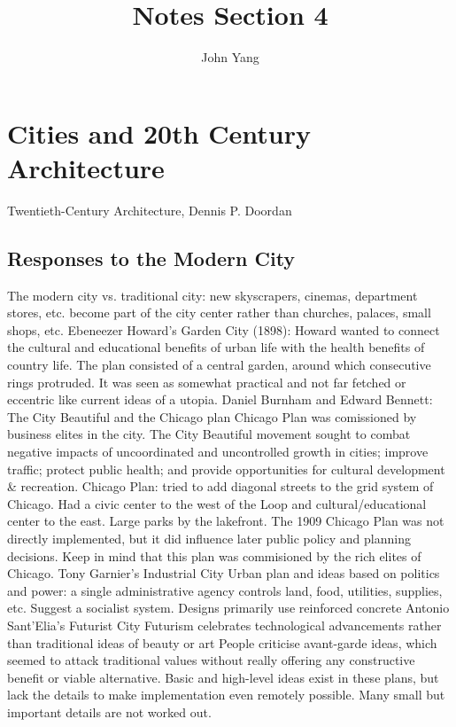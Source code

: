 \documentclass{article}
\title{Notes Section 4} %
\author{John Yang}
\begin{document}
    \maketitle
    \tableofcontents
    \section{Cities and 20th Century Architecture}
    \small Twentieth-Century Architecture, Dennis P. Doordan \normalsize 
    \subsection{Responses to the Modern City}
    \begin{outline}
        \1 The modern city vs. traditional city: new skyscrapers, cinemas, department stores, etc. become part of the city center rather than churches, palaces, small shops, etc. 
        \1 Ebeneezer Howard's Garden City (1898):
            \2 Howard wanted to connect the cultural and educational benefits of urban life with the health benefits of country life. 
            \2 The plan consisted of a central garden, around which consecutive rings protruded. It was seen as somewhat practical and not far fetched or eccentric like current ideas of a utopia. 
        \1 Daniel Burnham and Edward Bennett: The City Beautiful and the Chicago plan 
             Chicago Plan was comissioned by business elites in the city. 
            \2 The City Beautiful movement sought to combat negative impacts of uncoordinated and uncontrolled growth in cities; improve traffic; protect public health; and provide opportunities for cultural development \& recreation. 
             Chicago Plan: tried to add diagonal streets to the grid system of Chicago. Had a civic center to the west of the Loop and cultural/educational center to the east. Large parks by the lakefront. 
            \2 The 1909 Chicago Plan was not directly implemented, but it did influence later public policy and planning decisions. Keep in mind that this plan was commisioned by the rich elites of Chicago. 
        \1 Tony Garnier's Industrial City 
            \2 Urban plan and ideas based on politics and power: a single administrative agency controls land, food, utilities, supplies, etc. Suggest a socialist system. 
            \2 Designs primarily use reinforced concrete
        \1 Antonio Sant'Elia's Futurist City 
            \2 Futurism celebrates technological advancements rather than traditional ideas of beauty or art 
            \2 People criticise avant-garde ideas, which seemed to attack traditional values without really offering any constructive benefit or viable alternative. 
            \2 Basic and high-level ideas exist in these plans, but lack the details to make implementation even remotely possible. Many small but important details are not worked out. 
    \end{outline}
\end{document}

